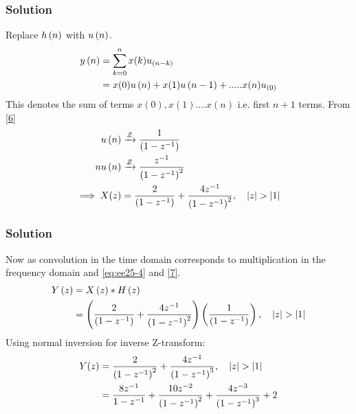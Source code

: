 \documentclass{beamer}
\begin{document}
\begin{frame}
\frametitle{Solution}
Replace $h\left(n\right)$ with $u\left(n\right)$.
\begin{align}
    y\left(n\right) &= \sum_{k=0}^{n} x(k)u_{\left(n-k\right)}\\
    &=x(0)u\left(n\right) + x(1)u\left(n-1\right) + ..... x(n)u_{\left(0\right)}
\end{align}
    This denotes the sum of terms $x(0),x(1)....x(n)$ i.e. first $n+1$ terms. From \eqref{6}\\
\begin{align}
    u\left(n\right) &\xrightarrow{\mathcal{Z}} \frac{1}{\left(1-z^{-1}\right)} \label{7}\\
nu\left(n\right) &\xrightarrow{\mathcal{Z}} \frac{z^{-1}}{\left(1-z^{-1}\right)^{2}}\\
  \implies  X(z)&= \frac{2}{\left(1-z^{-1}\right)} + \frac{4z^{-1}}{\left(1-z^{-1}\right)^{2}} \label{eq:ee25-4}
,\quad \left\vert z\right\vert>\left\vert1\right\vert 
\end{align}
\end{frame}





\begin{frame}
\frametitle{Solution}
Now as convolution in the time domain corresponds to multiplication in the frequency domain and \eqref{eq:ee25-4} and \eqref{7}.
\begin{align}
    Y\left(z\right) &= X\left(z\right) * H\left(z\right)\\
 &= \left(\frac{2}{\left(1-z^{-1}\right)} +
\frac{4z^{-1}}{\left(1-z^{-1}\right)^{2}}\right)\left(\frac{1}{\left(1-z^{-1}\right)}\right)
,\quad \left\vert z\right\vert>\left\vert1\right\vert     
\end{align}
Using normal inversion for inverse Z-transform:
\begin{align}
 Y(z) &= \frac{2}{\left(1-z^{-1}\right)^2} +
\frac{4z^{-1}}{\left(1-z^{-1}\right)^{3}}
,\quad \left\vert z\right\vert>\left\vert1\right\vert\\
   &= \frac{8z^{-1}}{1-z^{-1}} + \frac{10z^{-2}}{\left(1-z^{-1}\right)^2} + \frac{4z^{-3}}{\left(1-z^{-1}\right)^{3}} + 2\label{final}
\end{align}
    
\end{frame}
\end{document}
